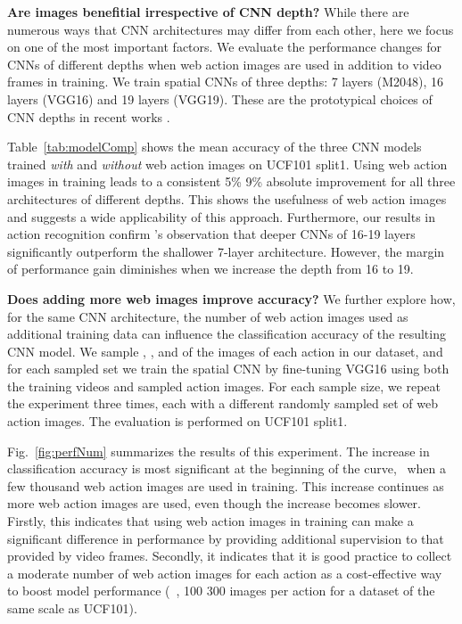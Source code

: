 \documentclass[10pt,twocolumn,letterpaper]{article}
\begin{document}
\vspace{0.1in}
\noindent \textbf{Are images benefitial irrespective of CNN depth?}
While there are numerous ways that CNN architectures may differ from each other, here we focus on one of the most important factors. We evaluate the performance changes for CNNs of different depths when web action images are used in addition to video frames in training. We train spatial CNNs of three depths: 7 layers (M2048), 16 layers (VGG16) and 19 layers (VGG19). These are the prototypical choices of CNN depths in recent works \cite{chatfield2014return, krizhevsky2012imagenet, long2014fully, simonyan2014two, simonyan2014very}.

Table~\ref{tab:modelComp} shows the mean accuracy of the three CNN models trained {\em with} and {\em without} web action images on UCF101 split1. Using web action images in training leads to a consistent 5\%  9\% absolute improvement for all three architectures of different depths. This shows the usefulness of web action images and suggests a wide applicability of this approach. Furthermore, our results in action recognition confirm \cite{simonyan2014very}'s observation that deeper CNNs of 16-19 layers significantly outperform the shallower 7-layer architecture. However, the margin of performance gain diminishes when we increase the depth from 16 to 19. 

\vspace{0.1in}
\noindent \textbf{Does adding more web images improve accuracy?} We further explore how, for the same CNN architecture, the number of web action images used as additional training data can influence the classification accuracy of the resulting CNN model. We sample , ,  and  of the images of each action in our dataset, and for each sampled set we train the spatial CNN by fine-tuning VGG16 using both the training videos and sampled action images. For each sample size, we repeat the experiment three times, each with a different randomly sampled set of web action images. The evaluation is performed on UCF101 split1. 

Fig.~\ref{fig:perfNum} summarizes the results of this experiment. The increase in classification accuracy is most significant at the beginning of the curve, \ie~when a few thousand web action images are used in training. This increase continues as more web action images are used, even though the increase becomes slower. Firstly, this indicates that using web action images in training can make a significant difference in performance by providing additional supervision to that provided by video frames. Secondly, it indicates that it is good practice to collect a moderate number of web action images for each action as a cost-effective way to boost model performance (\eg~, 100  300 images per action for a dataset of the same scale as UCF101). 
\end{document}
